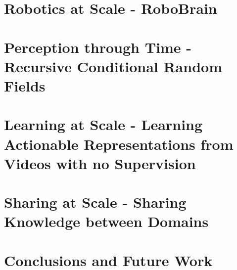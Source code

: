 \documentclass[phd,tocprelim]{cornell}
\begin{document}
\chapter{Robotics at Scale - RoboBrain}


\chapter{Perception through Time - Recursive Conditional Random Fields}
\label{rcrf}



\chapter{Learning at Scale - Learning Actionable Representations from Videos with no Supervision}
\label{repr}



\chapter{Sharing at Scale - Sharing Knowledge between Domains}
\label{repr2}




\chapter{Conclusions and Future Work}
\label{conc}


%


\end{document}
